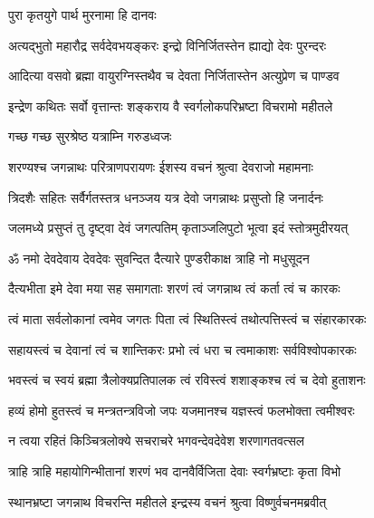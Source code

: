 
\onelineshloka
{पुरा कृतयुगे पार्थ मुरनामा हि दानवः} %

\twolineshloka
{अत्यद्भुतो महारौद्र सर्वदेवभयङ्करः}
{इन्द्रो विनिर्जितस्तेन ह्याद्यो देवः पुरन्दरः} %

\twolineshloka
{आदित्या वसवो ब्रह्मा वायुरग्निस्तथैव च}
{देवता निर्जितास्तेन अत्युप्रेण च पाण्डव} %

\twolineshloka
{इन्द्रेण कथितः सर्वो वृत्तान्तः शङ्कराय वै}
{स्वर्गलोकपरिभ्रष्टा विचरामो महीतले} %



\onelineshloka
{गच्छ गच्छ सुरश्रेष्ठ यत्राम्नि गरुडध्वजः} %

\twolineshloka
{शरण्यश्च जगन्नाथः परित्राणपरायणः}
{ईशस्य वचनं श्रुत्वा देवराजो महामनाः} %

\twolineshloka
{त्रिदशैः सहितः सर्वैर्गतस्तत्र धनञ्जय}
{यत्र देवो जगन्नाथः प्रसुप्तो हि जनार्दनः} %

\twolineshloka
{जलमध्ये प्रसुप्तं तु दृष्ट्वा देवं जगत्पतिम्}
{कृताञ्जलिपुटो भूत्वा इदं स्तोत्रमुदीरयत्} %

\twolineshloka
{ॐ नमो देवदेवाय देवदेवः सुवन्दित}
{दैत्यारे पुण्डरीकाक्ष त्राहि नो मधुसूदन} %

\twolineshloka
{दैत्यभीता इमे देवा मया सह समागताः}
{शरणं त्वं जगन्नाथ त्वं कर्ता त्वं च कारकः} %

\twolineshloka
{त्वं माता सर्वलोकानां त्वमेव जगतः पिता}
{त्वं स्थितिस्त्वं तथोत्पत्तिस्त्वं च संहारकारकः} %

\twolineshloka
{सहायस्त्वं च देवानां त्वं च शान्तिकरः प्रभो}
{त्वं धरा च त्वमाकाशः सर्वविश्वोपकारकः} %

\twolineshloka
{भवस्त्वं च स्वयं ब्रह्मा त्रैलोक्यप्रतिपालक}
{त्वं रविस्त्वं शशाङ्कश्च त्वं च देवो हुताशनः} %

\twolineshloka
{हव्यं होमो हुतस्त्वं च मन्त्रतन्त्रविजो जपः}
{यजमानश्च यज्ञस्त्वं फलभोक्ता त्वमीश्वरः} %

\twolineshloka
{न त्वया रहितं किञ्चित्रलोक्ये सचराचरे}
{भगवन्देवदेवेश शरणागतवत्सल} %

\twolineshloka
{त्राहि त्राहि महायोगिन्भीतानां शरणं भव}
{दानवैर्विजिता देवाः स्वर्गभ्रष्टाः कृता विभो} %

\twolineshloka
{स्थानभ्रष्टा जगन्नाथ विचरन्ति महीतले}
{इन्द्रस्य वचनं श्रुत्वा विष्णुर्वचनमब्रवीत्} %

